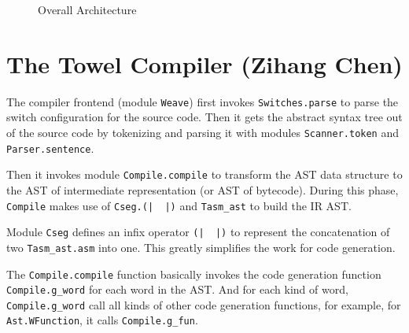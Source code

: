\documentclass{report}
\newcommand{\mtilde}[1]{\textasciitilde}
\begin{document}
\begin{figure}[H]
  \centering
  
  \caption{Overall Architecture}
  \label{fig:overall}
\end{figure}

\section{The Towel Compiler (Zihang Chen)}

  The compiler frontend (module \texttt{Weave}) first invokes \texttt{Switches.parse} to parse the switch configuration for the source code. Then it gets the abstract syntax tree out of the source code by tokenizing and parsing it with modules \texttt{Scanner.token} and \texttt{Parser.sentence}.

  Then it invokes module \texttt{Compile.compile} to transform the AST data structure to the AST of intermediate representation (or AST of bytecode). During this phase, \texttt{Compile} makes use of \texttt{Cseg.(|\mtilde ~\mtilde ~|)} and \texttt{Tasm\_ast} to build the IR AST.

  \begin{mdframed}[style=detail]
    Module \texttt{Cseg} defines an infix operator \texttt{(|\mtilde ~\mtilde ~|)} to represent the concatenation of two \texttt{Tasm\_ast.asm} into one. This greatly simplifies the work for code generation.

    The \texttt{Compile.compile} function basically invokes the code generation function \texttt{Compile.g\_word} for each word in the AST. And for each kind of word, \texttt{Compile.g\_word} call all kinds of other code generation functions, for example, for \texttt{Ast.WFunction}, it calls \texttt{Compile.g\_fun}.
  \end{mdframed}
\end{document}
